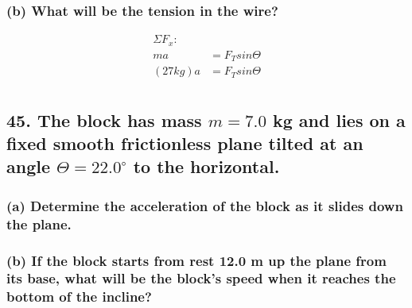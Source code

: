 \documentclass[12pt,a4paper,english]{article}
\begin{document}
\begin{flushleft}
  \subsubsection{(b) What will be the tension in the wire?}
  \begin{align*}
    \Sigma F_x:&
    \\
    ma&=F_Tsin\Theta
    \\
    (27kg)a&=F_Tsin\Theta
    \\
  \end{align*}
  \subsection{45. The block has mass $m=7.0$ kg and lies on a fixed smooth frictionless plane tilted at an angle $\Theta=22.0^\circ$ to the horizontal.}
  \subsubsection{(a) Determine the acceleration of the block as it slides down the plane.}
  \subsubsection{(b) If the block starts from rest 12.0 m up the plane from its base, what will be the block's speed when it reaches the bottom of the incline?}
\end{flushleft}
\end{document}
